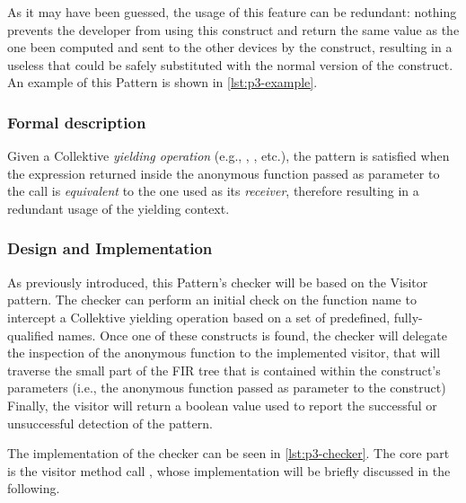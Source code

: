 \documentclass[12pt,a4paper,openright,twoside]{book}
\begin{document}
As it may have been guessed, the usage of this feature can be redundant: nothing
prevents the developer from using this construct and return the same value as
the one been computed and sent to the other devices by the construct, resulting
in a useless  that could be safely substituted with the normal
version of the construct. 
%
An example of this Pattern is shown in \cref{lst:p3-example}.



\subsubsection{Formal description}

Given a Collektive \emph{yielding operation} (e.g., ,
, etc.), the pattern is satisfied when the expression
returned inside the anonymous function passed as parameter to the
 call is \emph{equivalent} to the one used as its
\emph{receiver}, therefore resulting in a redundant usage of the yielding
context. 

\subsubsection{Design and Implementation}

As previously introduced, this Pattern's checker will be based on the Visitor
pattern. The checker can perform an initial check on the function name to
intercept a Collektive yielding operation based on a set of predefined,
fully-qualified names. 
%
Once one of these constructs is found, the checker will delegate the inspection
of the anonymous function to the implemented visitor, that will traverse the
small part of the \ac{FIR} tree that is contained within the construct's
parameters (i.e., the anonymous function passed as parameter to the construct)
%
Finally, the visitor will return a boolean value used to report the successful
or unsuccessful detection of the pattern.

The implementation of the checker can be seen in \cref{lst:p3-checker}. The core
part is the visitor method call ,
whose implementation will be briefly discussed in the following.


\end{document}
